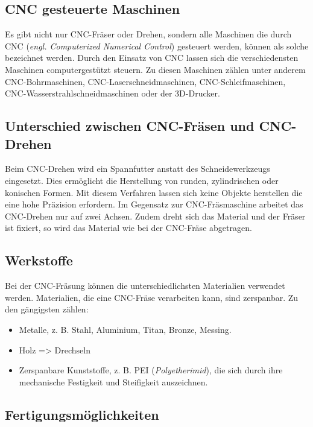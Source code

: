 \subsection{CNC gesteuerte Maschinen}
Es gibt nicht nur CNC-Fräser oder Drehen, sondern alle Maschinen die durch CNC (\emph{engl. Computerized Numerical Control}) gesteuert werden, können als solche bezeichnet werden. Durch den Einsatz von CNC lassen sich die verschiedensten Maschinen computergestützt steuern. Zu diesen Maschinen zählen unter anderem CNC-Bohrmaschinen,  CNC-Laserschneidmaschinen, CNC-Schleifmaschinen, CNC-Wasserstrahlschneidmaschinen oder der 3D-Drucker. \\
\textcite{ArtenCNCMaschinen}

\subsection{Unterschied zwischen CNC-Fräsen und CNC-Drehen}
Beim CNC-Drehen wird ein Spannfutter anstatt des Schneidewerkzeugs eingesetzt. Dies ermöglicht die Herstellung von runden, zylindrischen oder konischen Formen. Mit diesem Verfahren lassen sich keine Objekte herstellen die eine hohe Präzision erfordern. Im Gegensatz zur CNC-Fräsmaschine arbeitet das CNC-Drehen nur auf zwei Achsen. Zudem dreht sich das Material und der Fräser ist fixiert, so wird das Material wie bei der CNC-Fräse abgetragen. \\
\textcite{CNCDrehenUnterschied}


\subsection{Werkstoffe}
Bei der CNC-Fräsung können die unterschiedlichsten Materialien verwendet werden. Materialien, die eine CNC-Fräse verarbeiten kann, sind zerspanbar. Zu den gängigsten zählen:

\begin{itemize}
	\item Metalle, z. B. Stahl, Aluminium, Titan, Bronze, Messing.
	\item Holz => Drechseln
	\item Zerspanbare Kunststoffe, z. B. PEI (\emph{Polyetherimid}), die sich durch ihre mechanische Festigkeit und Steifigkeit auszeichnen.
\end{itemize}
\textcite{CNCFraesen3} \textcite{PEIZerspannung} \textcite{PEIKunststoffPolyetherimid}

\subsection{Fertigungsmöglichkeiten}

